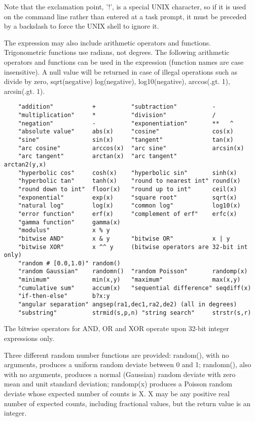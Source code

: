 \documentclass[11pt]{book}
\begin{document}
Note that the exclamation point, '!', is a special UNIX character, so
if it is used on the command line rather than entered at a task
prompt, it must be preceded by a backslash to force the UNIX shell to
ignore it.

The expression may  also include arithmetic operators and functions.
Trigonometric  functions use  radians,  not degrees.  The  following
arithmetic  operators and  functions  can be  used in the expression
(function names are case insensitive).  A null value will be returned
in case of illegal operations such as divide by zero, sqrt(negative)
log(negative), log10(negative), arccos(.gt. 1), arcsin(.gt. 1).

\begin{verbatim}
    "addition"           +          "subtraction"          -
    "multiplication"     *          "division"             /
    "negation"           -          "exponentiation"       **   ^
    "absolute value"     abs(x)     "cosine"               cos(x)
    "sine"               sin(x)     "tangent"              tan(x)
    "arc cosine"         arccos(x)  "arc sine"             arcsin(x)
    "arc tangent"        arctan(x)  "arc tangent"          arctan2(y,x)
    "hyperbolic cos"     cosh(x)    "hyperbolic sin"       sinh(x)
    "hyperbolic tan"     tanh(x)    "round to nearest int" round(x)
    "round down to int"  floor(x)   "round up to int"      ceil(x)
    "exponential"        exp(x)     "square root"          sqrt(x)
    "natural log"        log(x)     "common log"           log10(x)
    "error function"     erf(x)     "complement of erf"    erfc(x)
    "gamma function"     gamma(x)
    "modulus"            x % y      
    "bitwise AND"        x & y      "bitwise OR"           x | y
    "bitwise XOR"        x ^^ y     (bitwise operators are 32-bit int only)
    "random # [0.0,1.0)" random()
    "random Gaussian"    randomn()  "random Poisson"       randomp(x)
    "minimum"            min(x,y)   "maximum"              max(x,y)
    "cumulative sum"     accum(x)   "sequential difference" seqdiff(x)
    "if-then-else"       b?x:y
    "angular separation" angsep(ra1,dec1,ra2,de2) (all in degrees)
    "substring"          strmid(s,p,n) "string search"     strstr(s,r)
\end{verbatim}
The bitwise operators for AND, OR and XOR operate upon 32-bit integer 
expressions only.

Three different random number functions are provided: random(), with
no arguments, produces a uniform random deviate between 0 and 1;
randomn(), also with no arguments, produces a normal (Gaussian) random
deviate with zero mean and unit standard deviation; randomp(x)
produces a Poisson random deviate whose expected number of counts is
X.  X may be any positive real number of expected counts, including
fractional values, but the return value is an integer.
\end{document}
